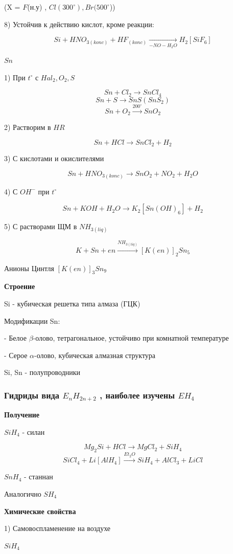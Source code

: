 (X = $F$(н.у) , $Cl (300^{\circ}), Br(500^{\circ}$))

8) Устойчив к действию кислот, кроме реакции:

$$Si + HNO_{3(konc)} + HF_{(konc)} \xrightarrow[-NO-H_2O]\ H_2[SiF_6]$$

$Sn$

1) При $t^{\circ}$ с $Hal_2, O_2, S$

$$Sn + Cl_2 \rightarrow SnCl_4$$
$$Sn+ S \rightarrow SnS (SnS_2)$$
$$Sn + O_2 \xrightarrow{200^{\circ}} SnO_2$$

2) Растворим в $HR$

$$Sn + HCl \rightarrow SnCl_2 + H_2$$

3) С кислотами и окислителями


$$Sn + HNO_{3(konc)} \rightarrow SnO_2 + NO_2 + H_2O$$

4) С $OH^-$  при $t^{\circ}$

$$Sn + KOH + H_2O \rightarrow K_2[Sn(OH)_6] + H_2$$

5) С растворами ЩМ в $NH_{3(liq)}$

$$K + Sn + en \xrightarrow{NH_{3(liq)}} [K(en)]_2Sn_5$$

Анионы Цинтля $[K(en)]_3Sn_9$

\textbf{Строение}

Si - кубическая решетка типа алмаза (ГЦК)

Модификации Sn: 

- Белое $\beta$-олово, тетрагональное, устойчиво при комнатной температуре

- Серое $\alpha$-олово, кубическая алмазная структура

Si, Sn - полупроводники


\subsubsection*{Гидриды вида $E_nH_{2n+2}$ , наиболее изучены $EH_4$}

\textbf{Получение}

$SiH_4$ - силан

$$Mg_2Si + HCl \rightarrow MgCl_2 + SiH_4$$
$$SiCl_4 + Li[AlH_4] \xrightarrow{Et_2O} SiH_4 + AlCl_3 + LiCl$$

$SnH_4$ - станнан

Аналогично $SH_4$

\textbf{Химические свойства}

1) Самовоспламенение на воздухе

$SiH_4$

